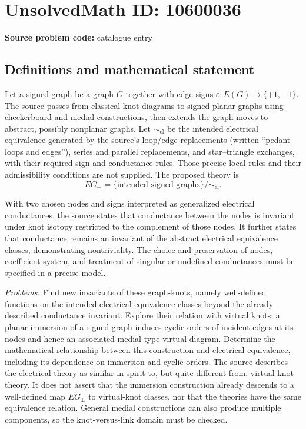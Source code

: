 \documentclass[11pt]{article}
\newcommand{\eps}{\varepsilon}
\begin{document}
\section*{UnsolvedMath ID: 10600036}
\textbf{Source problem code:} catalogue entry
\subsection{Definitions and mathematical statement}
Let a signed graph be a graph \(G\) together with edge signs \(\eps:E(G)\to\{+1,-1\}\). The source passes from classical knot diagrams to signed planar graphs using checkerboard and medial constructions, then extends the graph moves to abstract, possibly nonplanar graphs. Let \(\sim_{\mathrm{el}}\) be the intended electrical equivalence generated by the source's loop/edge replacements (written ``pedant loops and edges''), series and parallel replacements, and star--triangle exchanges, with their required sign and conductance rules. Those precise local rules and their admissibility conditions are not supplied. The proposed theory is
\[
 EG_{\pm}=\{\text{intended signed graphs}\}/\!\sim_{\mathrm{el}}.
\]

With two chosen nodes and signs interpreted as generalized electrical conductances, the source states that conductance between the nodes is invariant under knot isotopy restricted to the complement of those nodes. It further states that conductance remains an invariant of the abstract electrical equivalence classes, demonstrating nontriviality. The choice and preservation of nodes, coefficient system, and treatment of singular or undefined conductances must be specified in a precise model.

\emph{Problems.} Find new invariants of these graph-knots, namely well-defined functions on the intended electrical equivalence classes beyond the already described conductance invariant. Explore their relation with virtual knots: a planar immersion of a signed graph induces cyclic orders of incident edges at its nodes and hence an associated medial-type virtual diagram. Determine the mathematical relationship between this construction and electrical equivalence, including its dependence on immersion and cyclic orders. The source describes the electrical theory as similar in spirit to, but quite different from, virtual knot theory. It does not assert that the immersion construction already descends to a well-defined map \(EG_{\pm}\) to virtual-knot classes, nor that the theories have the same equivalence relation. General medial constructions can also produce multiple components, so the knot-versus-link domain must be checked.
\end{document}
